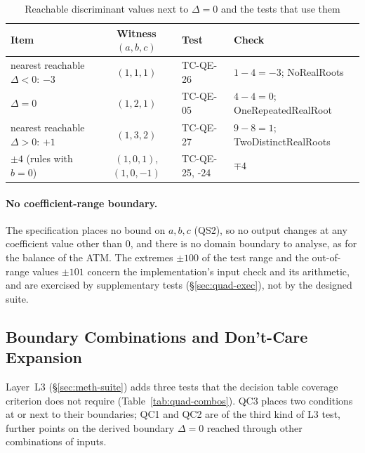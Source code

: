 \documentclass[11pt,a4paper]{article}
\begin{document}
\begin{table}[H]
\centering
\caption{Reachable discriminant values next to \(\Delta=0\) and the tests that use them}
\label{tab:quad-reach}
\small
\begin{tabularx}{\textwidth}{l c l Y}
\toprule
Item & Witness \((a,b,c)\) & Test & Check \\
\midrule
nearest reachable \(\Delta<0\): \(-3\) & \((1,1,1)\) & TC-QE-26 & \(1-4=-3\); NoRealRoots \\
\(\Delta=0\) & \((1,2,1)\) & TC-QE-05 & \(4-4=0\); OneRepeatedRealRoot \\
nearest reachable \(\Delta>0\): \(+1\) & \((1,3,2)\) & TC-QE-27 & \(9-8=1\); TwoDistinctRealRoots \\
\(\pm4\) (rules with \(b=0\)) & \((1,0,1)\), \((1,0,-1)\) & TC-QE-25, -24 & \(\mp4\) \\
\bottomrule
\end{tabularx}
\end{table}

\paragraph{No coefficient-range boundary.} The specification places no bound
on \(a,b,c\) (QS2), so no output changes at any coefficient value other than
\(0\), and there is no domain boundary to analyse, as for the balance of the
ATM. The extremes \(\pm100\) of the test range and the out-of-range values
\(\pm101\) concern the implementation's input check and its arithmetic, and
are exercised by supplementary tests (\S\ref{sec:quad-exec}), not by the
designed suite.
\subsection{Boundary Combinations and Don't-Care Expansion}
\label{sec:quad-combos}

Layer~L3 (\S\ref{sec:meth-suite}) adds three tests that the decision table
coverage criterion does not require (Table~\ref{tab:quad-combos}). QC3 places
two conditions at or next to their boundaries; QC1 and QC2 are of the third
kind of L3 test, further points on the derived boundary \(\Delta=0\) reached
through other combinations of inputs.
\end{document}

